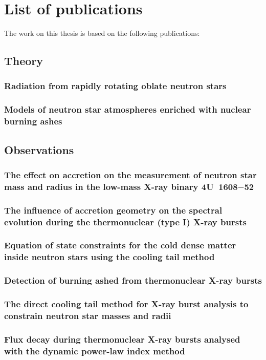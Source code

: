 \chapter*{List of publications}

The work on this thesis is based on the following publications:

\section*{Theory}
\subsection*{Radiation from rapidly rotating oblate neutron stars}

\subsection*{Models of neutron star atmospheres enriched with nuclear burning ashes}


\section*{Observations}
\subsection*{The effect on accretion on the measurement of neutron star mass and radius in the low-mass X-ray binary 4U~1608$-$52}

\subsection*{The influence of accretion geometry on the spectral evolution during the thermonuclear (type I) X-ray bursts}

\subsection*{Equation of state constraints for the cold dense matter inside neutron stars using the cooling tail method}

\subsection*{Detection of burning ashed from thermonuclear X-ray bursts}

\subsection*{The direct cooling tail method for X-ray burst analysis to constrain neutron star masses and radii}

\subsection*{Flux decay during thermonuclear X-ray bursts analysed with the dynamic power-law index method}




